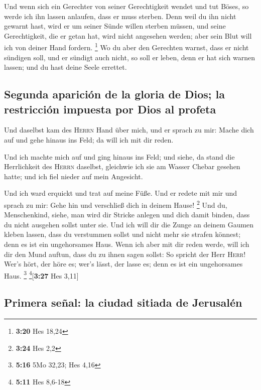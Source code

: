  Und wenn sich ein Gerechter von seiner Gerechtigkeit
wendet und tut Böses, so werde ich ihn lassen anlaufen, dass er muss
sterben. Denn weil du ihn nicht gewarnt hast, wird er um seiner Sünde
willen sterben müssen, und seine Gerechtigkeit, die er getan hat, wird
nicht angesehen werden; aber sein Blut will ich von deiner Hand fordern.
\footnote{\textbf{3:20} Hes 18,24}  Wo du aber den
Gerechten warnst, dass er nicht sündigen soll, und er sündigt auch
nicht, so soll er leben, denn er hat sich warnen lassen; und du hast
deine Seele errettet.

\hypertarget{segunda-apariciuxf3n-de-la-gloria-de-dios-la-restricciuxf3n-impuesta-por-dios-al-profeta}{%
\subsection{Segunda aparición de la gloria de Dios; la restricción
impuesta por Dios al
profeta}\label{segunda-apariciuxf3n-de-la-gloria-de-dios-la-restricciuxf3n-impuesta-por-dios-al-profeta}}

 Und daselbst kam des \textsc{Herrn} Hand über mich, und
er sprach zu mir: Mache dich auf und gehe hinaus ins Feld; da will ich
mit dir reden.

 Und ich machte mich auf und ging hinaus ins Feld; und
siehe, da stand die Herrlichkeit des \textsc{Herrn} daselbst, gleichwie
ich sie am Wasser Chebar gesehen hatte; und ich fiel nieder auf mein
Angesicht.

 Und ich ward erquickt und trat auf meine Füße. Und er
redete mit mir und sprach zu mir: Gehe hin und verschließ dich in deinem
Hause! \footnote{\textbf{3:24} Hes 2,2}  Und du,
Menschenkind, siehe, man wird dir Stricke anlegen und dich damit binden,
dass du nicht ausgehen sollst unter sie.  Und ich will
dir die Zunge an deinem Gaumen kleben lassen, dass du verstummen sollst
und nicht mehr sie strafen könnest; denn es ist ein ungehorsames Haus.
 Wenn ich aber mit dir reden werde, will ich dir den Mund
auftun, dass du zu ihnen sagen sollst: So spricht der Herr
\textsc{Herr}! Wer's hört, der höre es; wer's lässt, der lasse es; denn
es ist ein ungehorsames Haus. \footnote{\textbf{5:16} 5Mo 32,23; Hes
  4,16} \footnote{\textbf{5:11} Hes 8,6-18}{[}\textbf{3:27} Hes 3,11{]}

\hypertarget{primera-seuxf1al-la-ciudad-sitiada-de-jerusaluxe9n}{%
\subsection{Primera señal: la ciudad sitiada de
Jerusalén}\label{primera-seuxf1al-la-ciudad-sitiada-de-jerusaluxe9n}}

